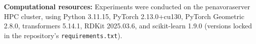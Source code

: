 \documentclass[11pt,a4paper]{article}
\begin{document}
\textbf{Computational resources:} Experiments were conducted on the penavoraserver HPC cluster, using Python 3.11.15, PyTorch 2.13.0+cu130, PyTorch Geometric 2.8.0, transformers 5.14.1, RDKit 2025.03.6, and scikit-learn 1.9.0 (versions locked in the repository's \texttt{requirements.txt}).



\end{document}
